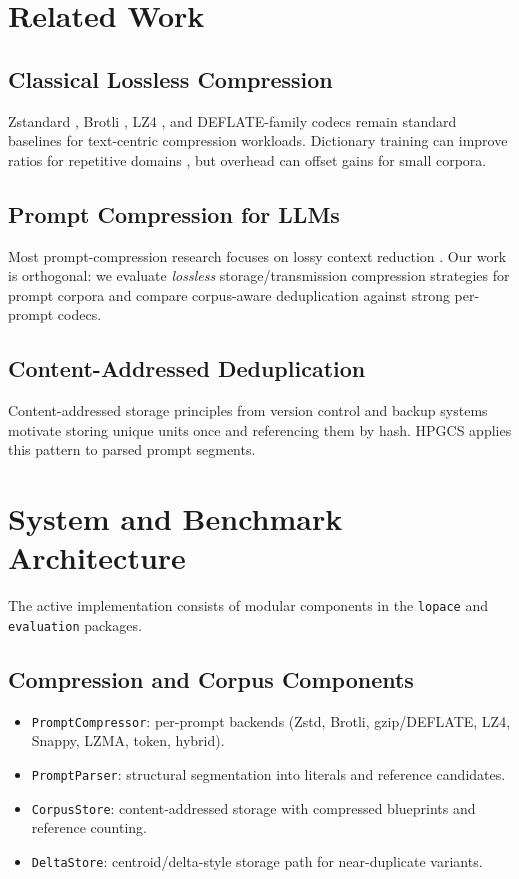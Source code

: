\documentclass[10pt,conference]{IEEEtran}
\begin{document}
\section{Related Work}
\subsection{Classical Lossless Compression}
Zstandard \cite{zstd2015}, Brotli \cite{brotli2015}, LZ4 \cite{lz4}, and DEFLATE-family codecs remain standard baselines for text-centric compression workloads. Dictionary training can improve ratios for repetitive domains \cite{zstd_dict2020}, but overhead can offset gains for small corpora.

\subsection{Prompt Compression for LLMs}
Most prompt-compression research focuses on lossy context reduction \cite{prompt_compression2023, gisting2024}. Our work is orthogonal: we evaluate \textit{lossless} storage/transmission compression strategies for prompt corpora and compare corpus-aware deduplication against strong per-prompt codecs.

\subsection{Content-Addressed Deduplication}
Content-addressed storage principles from version control and backup systems \cite{git2005, dedup_storage2010, datadomain2007} motivate storing unique units once and referencing them by hash. HPGCS applies this pattern to parsed prompt segments.

\section{System and Benchmark Architecture}
The active implementation consists of modular components in the \texttt{lopace} and \texttt{evaluation} packages.

\subsection{Compression and Corpus Components}
\begin{itemize}
    \item \texttt{PromptCompressor}: per-prompt backends (Zstd, Brotli, gzip/DEFLATE, LZ4, Snappy, LZMA, token, hybrid).
    \item \texttt{PromptParser}: structural segmentation into literals and reference candidates.
    \item \texttt{CorpusStore}: content-addressed storage with compressed blueprints and reference counting.
    \item \texttt{DeltaStore}: centroid/delta-style storage path for near-duplicate variants.
\end{itemize}
\end{document}
